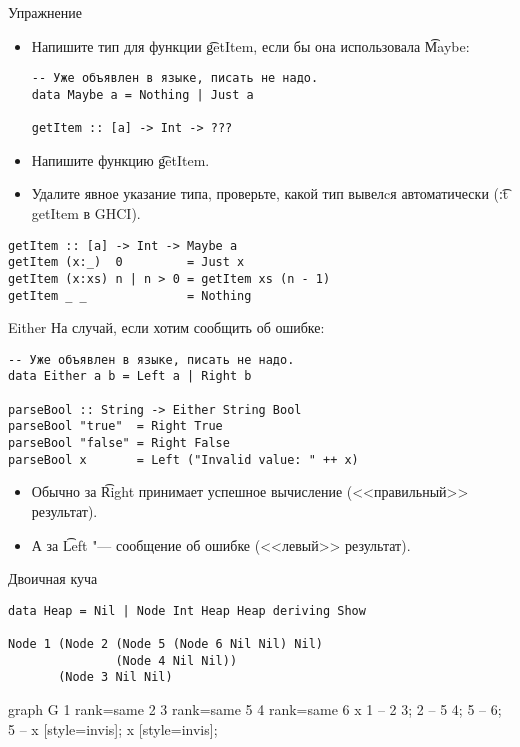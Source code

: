\begin{frame}[t,fragile]{Упражнение}
	\begin{itemize}
		\item Напишите тип для функции \t{getItem}, если бы она использовала \t{Maybe}:
\begin{verbatim}
-- Уже объявлен в языке, писать не надо.
data Maybe a = Nothing | Just a

getItem :: [a] -> Int -> ???
\end{verbatim}
		\item Напишите функцию \t{getItem}.
		\item Удалите явное указание типа, проверьте, какой тип вывелcя автоматически (\t{:t getItem} в GHCI).
	\end{itemize}
	\pause
\begin{verbatim}
getItem :: [a] -> Int -> Maybe a
getItem (x:_)  0         = Just x
getItem (x:xs) n | n > 0 = getItem xs (n - 1)
getItem _ _              = Nothing
\end{verbatim}
\end{frame}

\begin{frame}[fragile]{Either}
	На случай, если хотим сообщить об ошибке:
\begin{verbatim}
-- Уже объявлен в языке, писать не надо.
data Either a b = Left a | Right b

parseBool :: String -> Either String Bool
parseBool "true"  = Right True
parseBool "false" = Right False
parseBool x       = Left ("Invalid value: " ++ x)
\end{verbatim}
	\begin{itemize}
		\item Обычно за \t{Right} принимает успешное вычисление (<<правильный>> результат).
		\item А за \t{Left} "--- сообщение об ошибке (<<левый>> результат).
	\end{itemize}
\end{frame}

\begin{frame}[fragile]{Двоичная куча}
\begin{verbatim}
data Heap = Nil | Node Int Heap Heap deriving Show

Node 1 (Node 2 (Node 5 (Node 6 Nil Nil) Nil)
               (Node 4 Nil Nil))
       (Node 3 Nil Nil)
\end{verbatim}
	\begin{center}
		\begin{dot2tex}[scale=0.5,options=-tmath]
			graph G {
			    1 {rank=same 2 3} {rank=same 5 4} { rank=same 6 x }
			    1 -- {2 3};
			    2 -- {5 4};
			    5 -- 6;
			    5 -- x [style=invis];
			    x [style=invis];
			}
		\end{dot2tex}
	\end{center}
\end{frame}

